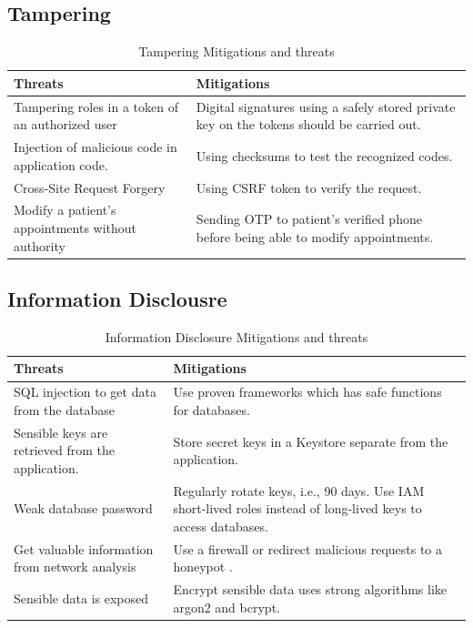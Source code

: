 \subsection{Tampering}

\begingroup
\centering
\setlength{\tabcolsep}{6.5pt} %
\renewcommand{\arraystretch}{1.8} %
\begin{longtable}{ |p{7cm}| p{8cm} |}
\caption{Tampering Mitigations and threats}
    \label{table:tamp}
\hline
\textbf{Threats} & \textbf{Mitigations} \\
\hline
Tampering roles in a token of an authorized user & Digital signatures using a safely stored private key on the tokens should be carried out.\\
\hline
Injection of malicious code in application code. & Using checksums to test the recognized codes.\\
\hline
Cross-Site Request Forgery & Using CSRF token to verify the request.\\
\hline
Modify a patient's appointments without authority & Sending OTP to patient's verified phone before being able to modify appointments.\\
\hline
\end{longtable}
\endgroup



\subsection{Information Disclousre}

\begingroup
\centering
\setlength{\tabcolsep}{6.5pt} %
\renewcommand{\arraystretch}{1.8} %
\begin{longtable}{ |p{7cm}| p{8cm} |}
\caption{Information Disclosure Mitigations and threats}
    \label{table:info_dis}
\hline
\textbf{Threats} & \textbf{Mitigations}\\
\hline
SQL injection to get data from the database & Use proven frameworks which has safe functions for databases.\\
\hline
Sensible keys are retrieved from the application. & Store secret keys in a Keystore separate from the application.\\
\hline
Weak database password &  Regularly rotate keys, i.e., 90 days. \newline
Use IAM short-lived roles instead of long-lived keys to access databases. \\
\hline
Get valuable information from network analysis & Use a firewall or redirect malicious requests to a honeypot \citep{manageengine}.\\
\hline
Sensible data is exposed & Encrypt sensible data uses strong algorithms like argon2 and bcrypt. \citep{owasp_secure_encrypt}\\
\hline
\end{longtable}
\endgroup

